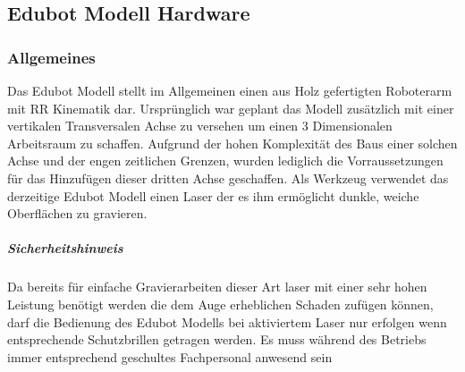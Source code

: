 \subsection{Edubot Modell Hardware}
\subsubsection{Allgemeines}
Das Edubot Modell stellt im Allgemeinen einen aus Holz gefertigten Roboterarm mit RR Kinematik dar. Ursprünglich war geplant das Modell zusätzlich mit einer vertikalen Transversalen Achse zu versehen um einen 3 Dimensionalen Arbeitsraum zu schaffen. Aufgrund der hohen Komplexität des Baus einer solchen Achse und der engen zeitlichen Grenzen, wurden lediglich die Vorraussetzungen für das Hinzufügen dieser dritten Achse geschaffen. Als Werkzeug verwendet das derzeitige Edubot Modell einen Laser der es ihm ermöglicht dunkle, weiche Oberflächen zu gravieren.

\subparagraph{Sicherheitshinweis}

Da bereits für einfache Gravierarbeiten dieser Art laser mit einer sehr hohen Leistung benötigt werden die dem Auge erheblichen Schaden zufügen können, darf die Bedienung des Edubot Modells bei aktiviertem Laser nur erfolgen wenn entsprechende Schutzbrillen getragen werden. Es muss während des Betriebs immer entsprechend geschultes Fachpersonal anwesend sein
